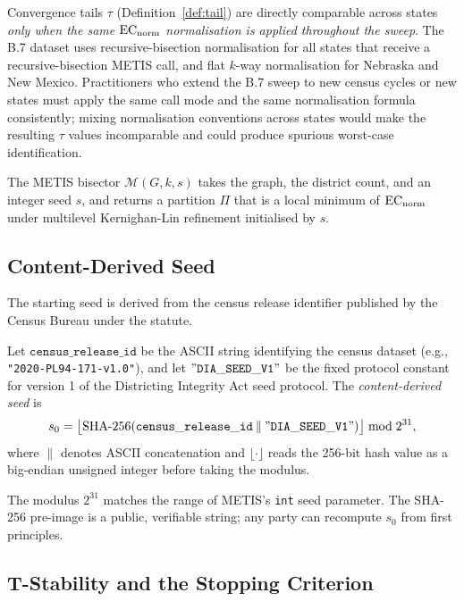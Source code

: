 \begin{remark}
Convergence tails $\tau$ (Definition~\ref{def:tail}) are directly comparable
across states \emph{only when the same $\mathrm{EC}_{\mathrm{norm}}$ normalisation is applied
throughout the sweep}.
The B.7 dataset uses recursive-bisection normalisation for all states that
receive a recursive-bisection METIS call, and flat $k$-way normalisation for
Nebraska and New Mexico.
Practitioners who extend the B.7 sweep to new census cycles or new states
must apply the same call mode and the same normalisation formula consistently;
mixing normalisation conventions across states would make the resulting $\tau$
values incomparable and could produce spurious worst-case identification.
\end{remark}

The METIS bisector $\mathcal{M}(G, k, s)$ takes the graph, the district count,
and an integer seed $s$, and returns a partition $\Pi$ that is a local minimum
of $\mathrm{EC}_{\mathrm{norm}}$ under multilevel Kernighan-Lin refinement initialised by $s$.

\subsection{Content-Derived Seed}

The starting seed is derived from the census release identifier published by
the Census Bureau under the \dia{} statute.

\begin{definition}
\label{def:seed}
Let $\mathtt{census\_release\_id}$ be the ASCII string identifying the census
dataset (e.g., \texttt{"2020-PL94-171-v1.0"}), and let
$\mathtt{"DIA\_SEED\_V1"}$ be the fixed protocol constant for version 1 of the
Districting Integrity Act seed protocol.
The \emph{content-derived seed} is
\[
  s_0 = \bigl\lfloor
    \mathrm{SHA\text{-}256}(\mathtt{census\_release\_id}
      \mathbin{\|} \mathtt{"DIA\_SEED\_V1"})
  \bigr\rfloor \bmod 2^{31},
\]
where $\|$ denotes ASCII concatenation and $\lfloor \cdot \rfloor$ reads the
256-bit hash value as a big-endian unsigned integer before taking the modulus.
\end{definition}

The modulus $2^{31}$ matches the range of METIS's \texttt{int} seed parameter.
The SHA-256 pre-image is a public, verifiable string; any party can recompute
$s_0$ from first principles.

\subsection{T-Stability and the Stopping Criterion}

